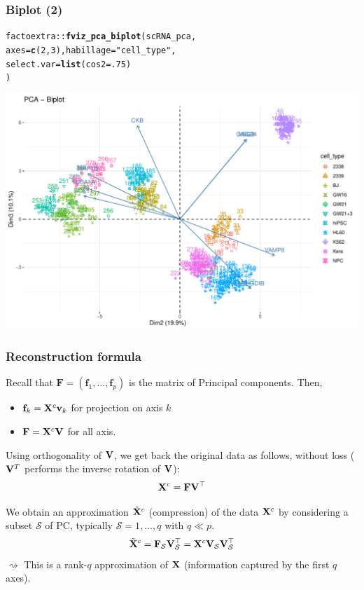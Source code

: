 \documentclass{beamer}\usepackage[]{graphicx}\usepackage[]{color}
\makeatletter
\newcommand{\hlnum}[1]{\textcolor[rgb]{0.686,0.059,0.569}{#1}}%
\newcommand{\hlstr}[1]{\textcolor[rgb]{0.192,0.494,0.8}{#1}}%
\newcommand{\hlopt}[1]{\textcolor[rgb]{0,0,0}{#1}}%
\newcommand{\hlstd}[1]{\textcolor[rgb]{0.345,0.345,0.345}{#1}}%
\newcommand{\hlkwc}[1]{\textcolor[rgb]{0.333,0.667,0.333}{#1}}%
\newcommand{\hlkwd}[1]{\textcolor[rgb]{0.737,0.353,0.396}{\textbf{#1}}}%
\newenvironment{kframe}{%
 \def\at@end@of@kframe{}%
 \ifinner\ifhmode%
  \def\at@end@of@kframe{\end{minipage}}%
  \begin{minipage}{\columnwidth}%
 \fi\fi%
 \def\FrameCommand##1{\hskip\@totalleftmargin \hskip-\fboxsep
 \colorbox{shadecolor}{##1}\hskip-\fboxsep
     \hskip-\linewidth \hskip-\@totalleftmargin \hskip\columnwidth}%
 \MakeFramed {\advance\hsize-\width
   \@totalleftmargin\z@ \linewidth\hsize
   \@setminipage}}%
 {\par\unskip\endMakeFramed%
 \at@end@of@kframe}
\newenvironment{knitrout}{}{} %
\makeatother
\begin{document}
\begin{frame}[fragile]
  \frametitle{Biplot (2)}
\begin{knitrout}\scriptsize
{}\color{fgcolor}\begin{kframe}
\begin{alltt}
  \hlstd{factoextra}\hlopt{::}\hlkwd{fviz_pca_biplot}\hlstd{(scRNA_pca,}
    \hlkwc{axes} \hlstd{=} \hlkwd{c}\hlstd{(}\hlnum{2}\hlstd{,}\hlnum{3}\hlstd{),} \hlkwc{habillage} \hlstd{=} \hlstr{"cell_type"}\hlstd{,}
    \hlkwc{select.var} \hlstd{=} \hlkwd{list}\hlstd{(}\hlkwc{cos2} \hlstd{=} \hlnum{.75}\hlstd{)}
  \hlstd{)}
\end{alltt}
\end{kframe}
\includegraphics[width=.8\textwidth]{figures/biplot2_scRNA_untransformed-1} 
\end{knitrout}
\end{frame}

\begin{frame}
  \frametitle{Reconstruction formula}

    Recall that $\mathbf{F} = (\mathbf{f}_1, \dots, \mathbf{f}_p) $ is the matrix of Principal components. Then,  
    \begin{itemize}
      \item  $\mathbf{f}_k = \mathbf{X}^c \mathbf{v}_k$ for projection on axis $k$
      \item $\mathbf{F} = \mathbf{X}^c \mathbf{V}$ for all axis.
    \end{itemize}
    Using orthogonality of $\mathbf{V}$, we get back the original data as follows, without loss ($\mathbf{V}^T$ performs the inverse rotation of $\mathbf{V}$):
    \begin{equation*}
      \mathbf{X}^c = \mathbf{F}\mathbf{V}^\top 
    \end{equation*}

    \vfill

    We obtain an approximation $\tilde{\mathbf{X}}^c$ (compression) of the data $\mathbf{X}^c$ by considering a subset $\mathcal{S}$ of PC, typically $\mathcal{S} = {1, \dots, q}$ with $q \ll p$.
    \begin{equation*}
      \tilde{\mathbf{X}}^c = \mathbf{F}_{\mathcal{S}}\mathbf{V}_{\mathcal{S}}^\top = \mathbf{X}^c \mathbf{V}_{\mathcal{S}} \mathbf{V}_{\mathcal{S}}^\top
    \end{equation*}
    $\rightsquigarrow$ This is a rank-$q$ approximation of $\mathbf{X}$ (information captured by the first $q$ axes).

\end{frame}
\end{document}
